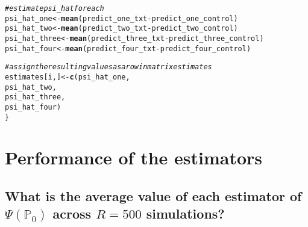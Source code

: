 \documentclass{article}\usepackage[]{graphicx}\usepackage[]{xcolor}
\makeatletter
\newcommand{\hlcom}[1]{\textcolor[rgb]{0.678,0.584,0.686}{\textit{#1}}}%
\newcommand{\hlopt}[1]{\textcolor[rgb]{0,0,0}{#1}}%
\newcommand{\hlstd}[1]{\textcolor[rgb]{0.345,0.345,0.345}{#1}}%
\newcommand{\hlkwb}[1]{\textcolor[rgb]{0.69,0.353,0.396}{#1}}%
\newcommand{\hlkwd}[1]{\textcolor[rgb]{0.737,0.353,0.396}{\textbf{#1}}}%
\newenvironment{kframe}{%
 \def\at@end@of@kframe{}%
 \ifinner\ifhmode%
  \def\at@end@of@kframe{\end{minipage}}%
  \begin{minipage}{\columnwidth}%
 \fi\fi%
 \def\FrameCommand##1{\hskip\@totalleftmargin \hskip-\fboxsep
 \colorbox{shadecolor}{##1}\hskip-\fboxsep
     \hskip-\linewidth \hskip-\@totalleftmargin \hskip\columnwidth}%
 \MakeFramed {\advance\hsize-\width
   \@totalleftmargin\z@ \linewidth\hsize
   \@setminipage}}%
 {\par\unskip\endMakeFramed%
 \at@end@of@kframe}
\newenvironment{knitrout}{}{} %
\makeatother
\begin{document}
\begin{knitrout}
\begin{kframe}
\begin{alltt}
  \hlcom{# estimate psi_hat for each}
  \hlstd{psi_hat_one} \hlkwb{<-} \hlkwd{mean}\hlstd{(predict_one_txt} \hlopt{-} \hlstd{predict_one_control)}
  \hlstd{psi_hat_two} \hlkwb{<-} \hlkwd{mean}\hlstd{(predict_two_txt} \hlopt{-} \hlstd{predict_two_control)}
  \hlstd{psi_hat_three} \hlkwb{<-} \hlkwd{mean}\hlstd{(predict_three_txt} \hlopt{-} \hlstd{predict_three_control)}
  \hlstd{psi_hat_four} \hlkwb{<-} \hlkwd{mean}\hlstd{(predict_four_txt} \hlopt{-} \hlstd{predict_four_control)}

  \hlcom{# assign the resulting values as a row in matrix estimates}
  \hlstd{estimates[i,]} \hlkwb{<-} \hlkwd{c}\hlstd{(psi_hat_one,}
                     \hlstd{psi_hat_two,}
                     \hlstd{psi_hat_three,}
                     \hlstd{psi_hat_four)}
\hlstd{\}}
\end{alltt}


{\ttfamily\noindent\color{warningcolor}{\#\# Warning: glm.fit: fitted probabilities numerically 0 or 1 occurred}}

{\ttfamily\noindent\color{warningcolor}{\#\# Warning: glm.fit: fitted probabilities numerically 0 or 1 occurred}}

{\ttfamily\noindent\color{warningcolor}{\#\# Warning: glm.fit: fitted probabilities numerically 0 or 1 occurred}}

{\ttfamily\noindent\color{warningcolor}{\#\# Warning: glm.fit: fitted probabilities numerically 0 or 1 occurred}}

{\ttfamily\noindent\color{warningcolor}{\#\# Warning: glm.fit: fitted probabilities numerically 0 or 1 occurred}}

{\ttfamily\noindent\color{warningcolor}{\#\# Warning: glm.fit: fitted probabilities numerically 0 or 1 occurred}}\end{kframe}
\end{knitrout}
    
\section{Performance of the estimators}

  \subsection{What is the average value of each estimator of $\Psi(\mathbb{P}_0)$ across $R=500$ simulations?}
  
\end{document}
